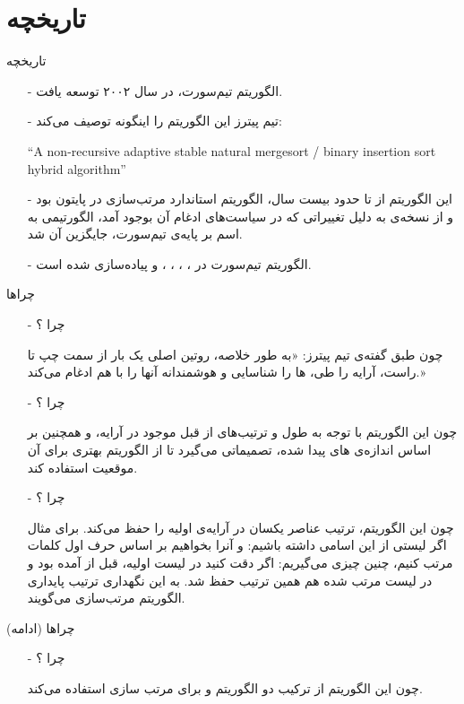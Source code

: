 \section{تاریخچه}
\begin{frame}{تاریخچه}
\begin{itemize}\itemr
\item[-]
الگوریتم تیم‌سورت، در سال ۲۰۰۲ توسعه یافت.

\item[-]
تیم‌ پیترز این الگوریتم را اینگونه توصیف می‌کند:
\begin{flushleft}
\begin{latin}
``A non-recursive adaptive stable natural mergesort / binary insertion sort hybrid algorithm''
\end{latin}
\end{flushleft}

\item[-]
این الگوریتم از 
تا حدود بیست سال، الگوریتم استاندارد مرتب‌سازی در پایتون بود و از نسخه‌ی  
به دلیل تغییراتی که در سیاست‌های ادغام آن بوجود آمد، الگورتیمی به اسم 
بر پایه‌ی تیم‌سورت، جایگزین آن شد.

\item[-]
الگوریتم تیم‌سورت در 
،
،
،
،
 و 
پیاده‌سازی شده است.
\end{itemize}
\end{frame}

\begin{frame}{چراها}
\begin{itemize}\itemr
\item[-]
چرا ؟

چون طبق گفته‌ی تیم پیترز: «به طور خلاصه، روتین اصلی یک بار از سمت چپ تا راست، آرایه را طی، ‌ها را شناسایی و هوشمندانه‌ آنها را با هم ادغام می‌کند.»

\item[-]
چرا ؟

چون این الگوریتم با توجه به طول و ترتیب‌های از قبل موجود در آرایه، و همچنین بر اساس اندازه‌‌ی 
های
پیدا شده، تصمیماتی می‌گیرد تا از الگوریتم بهتری برای آن موقعیت استفاده کند.

\item[-]
چرا ؟

چون این الگوریتم، ترتیب عناصر یکسان در آرایه‌ی اولیه را حفظ می‌کند. برای مثال اگر لیستی از این اسامی داشته باشیم: 
و آنرا بخواهیم بر اساس حرف اول کلمات مرتب کنیم، چنین چیزی می‌گیریم:
اگر دقت کنید در لیست اولیه،  قبل از  آمده بود و در لیست مرتب شده هم همین ترتیب حفظ شد. به این نگهداری ترتیب پایداری الگوریتم مرتب‌سازی می‌گویند.
\end{itemize}
\end{frame}

\begin{frame}{چراها (ادامه)}
\begin{itemize}\itemr
\item[-]
چرا ؟

چون این الگوریتم از ترکیب دو الگوریتم 
و
برای مرتب سازی استفاده می‌کند.
\end{itemize}
\end{frame}